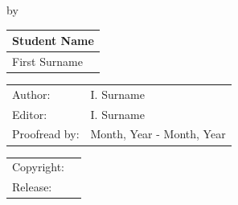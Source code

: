 \begin{titlepage}

\begin{center}

{\makeatletter
\largetitlestyle\fontsize{45}{45}\selectfont\@title
\makeatother}

{\makeatletter
\ifdefvoid{\@subtitle}{}{\bigskip\titlestyle\fontsize{20}{20}\selectfont\@subtitle}
\makeatother}

\bigskip
\bigskip

by

\bigskip
\bigskip

{\makeatletter
\largetitlestyle\fontsize{25}{25}\selectfont\@author
\makeatother}

\bigskip
\bigskip

\setlength\extrarowheight{2pt}
\begin{tabular}{l}
    Student Name \\\midrule
    First Surname \\
\end{tabular}

\vfill

\begin{tabular}{ll}
    Author: & I. Surname \\
    Editor: & I. Surname \\
    Proofread by: & Month, Year - Month, Year
\end{tabular}

\bigskip
\bigskip

\begin{tabular}{p{15mm}p{10cm}}
    Copyright: &  \\
    Release: & 
\end{tabular}

\end{center}


\end{titlepage}
